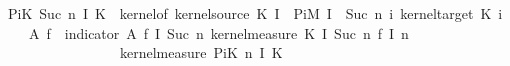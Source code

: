 {{\isachardoublequoteopen}PiK\ {\isacharparenleft}{\kern0pt}Suc\ n{\isacharparenright}{\kern0pt}\ I\ K\ {\isacharequal}{\kern0pt}\ kernel{\isacharunderscore}{\kern0pt}of\ {\isacharparenleft}{\kern0pt}kernel{\isacharunderscore}{\kern0pt}source\ {\isacharparenleft}{\kern0pt}K\ {\isacharparenleft}{\kern0pt}I\ {}{\isacharparenright}{\kern0pt}{\isacharparenright}{\kern0pt}{\isacharparenright}{\kern0pt}\ {\isacharparenleft}{\kern0pt}PiM\ {\isacharparenleft}{\kern0pt}I\ {\isacharbackquote}{\kern0pt}\ {\isacharbraceleft}{\kern0pt}{}{\isachardot}{\kern0pt}{\isachardot}{\kern0pt}Suc\ n{\isacharbraceright}{\kern0pt}{\isacharparenright}{\kern0pt}\ {\isacharparenleft}{\kern0pt}{\isasymlambda}i{\isachardot}{\kern0pt}\ kernel{\isacharunderscore}{\kern0pt}target\ {\isacharparenleft}{\kern0pt}K\ i{\isacharparenright}{\kern0pt}{\isacharparenright}{\kern0pt}{\isacharparenright}{\kern0pt}\isanewline
\ \ {\isacharparenleft}{\kern0pt}{\isasymlambda}{\isasymomega}\ A{\isacharprime}{\kern0pt}{\isachardot}{\kern0pt}\ {\isasymintegral}\isactrlsup {\isacharplus}{\kern0pt}{\isasymomega}\isactrlsub f{\isachardot}{\kern0pt}\ {\isacharparenleft}{\kern0pt}{\isasymintegral}\isactrlsup {\isacharplus}{\kern0pt}{\isasymomega}{\isachardot}{\kern0pt}\ indicator\ A{\isacharprime}{\kern0pt}\ {\isacharparenleft}{\kern0pt}{\isasymomega}\isactrlsub f\ {\isacharparenleft}{\kern0pt}I\ {\isacharparenleft}{\kern0pt}Suc\ n{\isacharparenright}{\kern0pt}{\isacharcolon}{\kern0pt}{\isacharequal}{\kern0pt}{\isasymomega}{\isacharparenright}{\kern0pt}{\isacharparenright}{\kern0pt}\ {\isasympartial}kernel{\isacharunderscore}{\kern0pt}measure\ {\isacharparenleft}{\kern0pt}K\ {\isacharparenleft}{\kern0pt}I\ {\isacharparenleft}{\kern0pt}Suc\ n{\isacharparenright}{\kern0pt}{\isacharparenright}{\kern0pt}{\isacharparenright}{\kern0pt}\ {\isacharparenleft}{\kern0pt}{\isasymomega}\isactrlsub f\ {\isacharparenleft}{\kern0pt}I\ n{\isacharparenright}{\kern0pt}{\isacharparenright}{\kern0pt}{\isacharparenright}{\kern0pt}\isanewline
\ \ \ \ \ \ \ \ \ \ \ \ \ \ \ \ {\isasympartial}kernel{\isacharunderscore}{\kern0pt}measure\ {\isacharparenleft}{\kern0pt}PiK\ n\ I\ K{\isacharparenright}{\kern0pt}\ {\isasymomega}{\isacharparenright}{\kern0pt}{\isachardoublequoteclose}%
}%
